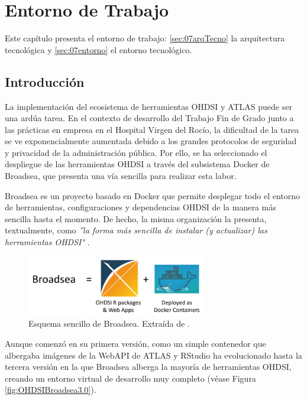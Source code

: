 \chapter{Entorno de Trabajo}\label{cap:07diseño}

Este capítulo presenta el entorno de trabajo: \ref{sec:07arqTecno} la arquitectura tecnológica y \ref{sec:07entorno} el entorno tecnológico.

\section{Introducción}

La implementación del ecosistema de herramientas OHDSI y ATLAS puede ser una ardúa tarea. En el contexto de desarrollo del Trabajo Fin de Grado junto a las prácticas en empresa en el Hospital Virgen del Rocío, la dificultad de la tarea se ve exponencialmente aumentada debido a los grandes protocolos de seguridad y privacidad de la administración pública. Por ello, se ha seleccionado el despliegue de las herramientas OHDSI a través del subsistema Docker de Broadsea, que presenta una vía sencilla para realizar esta labor. 

Broadsea es un proyecto basado en Docker que permite desplegar todo el entorno de herramientas, configuraciones y dependencias OHDSI de la manera más sencilla hasta el momento. De hecho, la misma organización la presenta, textualmente, como \textit{''la forma más sencilla de instalar (y actualizar) las herramientas OHDSI"} \cite{Broadsea3PDF}. 

\begin{figure}[H]
    \centering
    \includegraphics[width=0.70\textwidth]{figures/broadseaEq.png}
    \caption{Esquema sencillo de Broadsea. Extraída de \cite{Broadsea3PPTX}.}
    \label{fig:broadseaEq}
\end{figure}

Aunque comenzó en su primera versión, como un simple contenedor que albergaba imágenes de la WebAPI de ATLAS y RStudio \cite{Broadsea3PPTX} ha evolucionado hasta la tercera versión en la que Broadsea alberga la mayoría de herramientas OHDSI, creando un entorno virtual de desarrollo muy completo (véase Figura \ref{fig:OHDSIBroadsea3.0}). 

